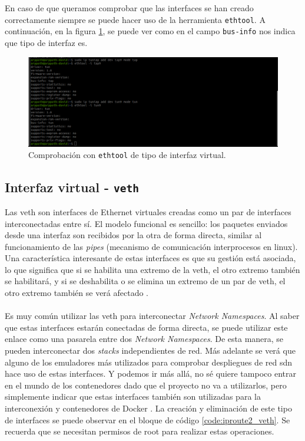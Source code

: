En caso de que queramos comprobar que las interfaces se han creado correctamente siempre se puede hacer uso de la herramienta \texttt{ethtool}. A continuación, en la figura \ref{fig:linux2}, se puede ver como en el campo \texttt{bus-info} nos indica que tipo de interfaz es.

\begin{figure}[ht]
    \centering
    \includegraphics[width=\textwidth]{archivos/img/teoria/linux2.png}
    \caption{Comprobación con \texttt{ethtool} de tipo de interfaz virtual.}
    \label{fig:linux2}
\end{figure}


\subsection{Interfaz virtual - \texttt{veth}}
\label{linuxVeths}
Las \gls{veth} son interfaces de Ethernet virtuales creadas como un par de interfaces interconectadas entre sí. El modelo funcional es sencillo: los paquetes enviados desde una interfaz son recibidos por la otra de forma directa, similar al funcionamiento de las \textit{pipes} (mecanismo de comunicación interprocesos en linux). Una característica interesante de estas interfaces es que su gestión está asociada, lo que significa que si se habilita una extremo de la \gls{veth}, el otro extremo también se habilitará, y si se deshabilita o se elimina un extremo de un par de \gls{veth}, el otro extremo también se verá afectado \cite{veth}.\\
\\
Es muy común utilizar las \gls{veth} para interconectar \textit{Network Namespaces}. Al saber que estas interfaces estarán conectadas de forma directa, se puede utilizar este enlace como una pasarela entre dos \textit{Network Namespaces}. De esta manera, se pueden interconectar dos \textit{stacks} independientes de red. Más adelante se verá que alguno de los emuladores más utilizados para comprobar despliegues de red \gls{sdn} hace uso de estas interfaces. Y podemos ir más allá, no sé quiere tampoco entrar en el mundo de los contenedores dado que el proyecto no va a utilizarlos, pero simplemente indicar que estas interfaces también son utilizadas para la interconexión y contenedores de Docker \cite{veths1}. La creación y eliminación de este tipo de interfaces se puede observar en el bloque de código \ref{code:iproute2_veth}. Se recuerda que se necesitan permisos de root para realizar estas operaciones.

